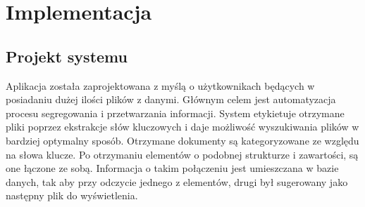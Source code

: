 \documentclass[12pt,a4paper,twoside]{article}
\begin{document}
\section{Implementacja}
\subsection{Projekt systemu}
Aplikacja została zaprojektowana z myślą o użytkownikach będących w posiadaniu dużej ilości plików z danymi. Głównym celem jest automatyzacja procesu segregowania i przetwarzania informacji. System etykietuje otrzymane pliki poprzez ekstrakcje słów kluczowych i daje możliwość wyszukiwania plików w bardziej optymalny sposób. Otrzymane dokumenty są kategoryzowane ze względu na słowa klucze. Po otrzymaniu elementów o podobnej strukturze i zawartości, są one łączone ze sobą. Informacja o takim połączeniu jest umieszczana w bazie danych, tak aby przy odczycie jednego z elementów, drugi był sugerowany jako następny plik do wyświetlenia. \par
\end{document}

